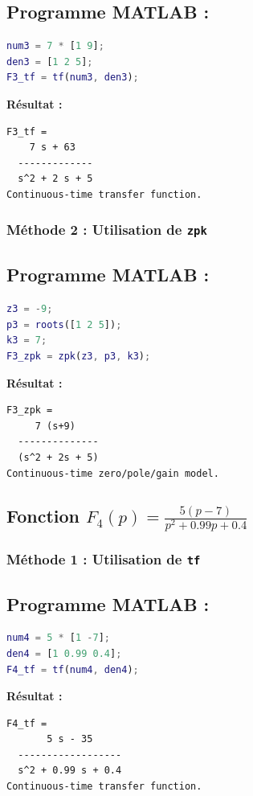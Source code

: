 \documentclass{article}
\begin{document}
\subsection*{Programme MATLAB :}
\begin{lstlisting}[language=Matlab]
% F3(p) = (7 * (p + 9)) / (p^2 + 2p + 5)
num3 = 7 * [1 9]; 
den3 = [1 2 5]; 
F3_tf = tf(num3, den3);
\end{lstlisting}

\textbf{Résultat :}
\begin{verbatim}
F3_tf =
    7 s + 63
  -------------
  s^2 + 2 s + 5
Continuous-time transfer function.
\end{verbatim}

\subsubsection*{Méthode 2 : Utilisation de \texttt{zpk}}
\subsection*{Programme MATLAB :}
\begin{lstlisting}[language=Matlab]
% F3(p)
z3 = -9;
p3 = roots([1 2 5]);
k3 = 7; 
F3_zpk = zpk(z3, p3, k3);
\end{lstlisting}

\textbf{Résultat :}
\begin{verbatim}
F3_zpk =
     7 (s+9)
  --------------
  (s^2 + 2s + 5)
Continuous-time zero/pole/gain model.
\end{verbatim}
\newpage
\subsection*{Fonction $F_4(p) = \frac{5(p - 7)}{p^2 + 0.99p + 0.4}$}

\subsubsection*{Méthode 1 : Utilisation de \texttt{tf}}
\subsection*{Programme MATLAB :}
\begin{lstlisting}[language=Matlab]
% F4(p) = (5 * (p - 7)) / (p^2 + 0.99p + 0.4)
num4 = 5 * [1 -7]; 
den4 = [1 0.99 0.4]; 
F4_tf = tf(num4, den4);
\end{lstlisting}

\textbf{Résultat :}
\begin{verbatim}
F4_tf =
       5 s - 35
  ------------------
  s^2 + 0.99 s + 0.4
Continuous-time transfer function.
\end{verbatim}
\end{document}
